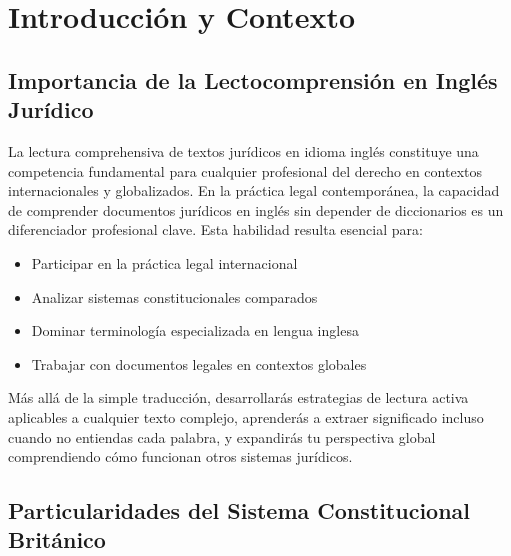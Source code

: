 \documentclass[12pt,oneside]{book}
\begin{document}

\tableofcontents

\newpage


\chapter{Introducción y Contexto}

\section{Importancia de la Lectocomprensión en Inglés Jurídico}

La lectura comprehensiva de textos jurídicos en idioma inglés constituye una competencia fundamental para cualquier profesional del derecho en contextos internacionales y globalizados. En la práctica legal contemporánea, la capacidad de comprender documentos jurídicos en inglés sin depender de diccionarios es un diferenciador profesional clave. Esta habilidad resulta esencial para:

\begin{itemize}
    \item Participar en la práctica legal internacional
    \item Analizar sistemas constitucionales comparados
    \item Dominar terminología especializada en lengua inglesa
    \item Trabajar con documentos legales en contextos globales
\end{itemize}

Más allá de la simple traducción, desarrollarás estrategias de lectura activa aplicables a cualquier texto complejo, aprenderás a extraer significado incluso cuando no entiendas cada palabra, y expandirás tu perspectiva global comprendiendo cómo funcionan otros sistemas jurídicos.

\section{Particularidades del Sistema Constitucional Británico}
\end{document}
